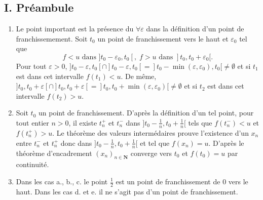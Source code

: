 \subsection*{I. Pr{\'e}ambule}
\begin{enumerate}
 \item Le point important est la pr{\'e}sence du $\forall \varepsilon$ dans la d{\'e}finition d'un point de franchissemement.\newline
 Soit $t_{0}$ un point de franchissement vers le haut et $\varepsilon_{0}$ tel que
 \begin{displaymath}
  f < u  \text{ dans } ]t_{0}-\varepsilon _{0}, t_{0}[, \;
  f>u \text{ dans } ]t_{0}, t_{0}+\varepsilon _{0}[.
 \end{displaymath}
 Pour tout $\varepsilon >0$, $] t_{0}-\varepsilon ,t_{0}[ \cap ]t_{0}-\varepsilon ,t_{0}[ =] t_{0}-\min (\varepsilon ,\varepsilon_{0}),t_{0}[ \neq \emptyset$ et si $t_{1}$ est dans cet intervalle $f(t_{1})<u$.
 De m{\^e}me, $] t_{0},t_{0}+\varepsilon [\cap ] t_{0},t_{0}+\varepsilon [ =] t_{0},t_{0}+\min (\varepsilon,\varepsilon _{0})[ \neq \emptyset $ et si $t_{2}$ est dans cet intervalle $f(t_{2})>u$.

  \item  Soit $t_{0}$ un point de franchissement. D'apr{\`e}s la d{\'e}finition d'un tel point, pour tout entier $n>0$, il existe $t_{n}^{+}$ et $t_{n}^{-}$
  dans $]t_{0}-\frac{1}{n},t_{0}+\frac{1}{n}[ $ tels que $f(t_{n}^{-})<u$ et $f(t_{n}^{+})>u$.
  Le th{\'e}or{\`e}me des valeurs interm{\'e}daires prouve l'existence d'un $x_{n}$ entre $t_{n}^{-}$ et $t_{n}^{+}$ donc dans
  $]t_{0}-\frac{1}{n},t_{0}+\frac{1}{n}[ $ et tel que $f(x_{n})=u$.
  D'apr{\`e}s le th{\'e}or{\`e}me d'encadrement $(x_{n})_{n\in \mathbf{N}}$ converge vers $t_{0}$ et $f(t_{0})=u$ par continuit{\'e}.

  \item  Dans les cas a., b., c. le point $\frac{1}{2}$ est un point de franchissement de $0$ vers le haut. Dans les cas d. et e. il ne s'agit pas d'un point de franchissement.


\end{enumerate}
